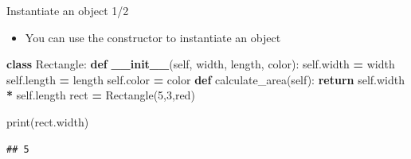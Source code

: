 \documentclass[
  8pt,
  ignorenonframetext,
]{beamer}
\newenvironment{Shaded}{\begin{snugshade}}{\end{snugshade}}
\newcommand{\BuiltInTok}[1]{#1}
\newcommand{\ControlFlowTok}[1]{\textcolor[rgb]{0.13,0.29,0.53}{\textbf{#1}}}
\newcommand{\DecValTok}[1]{\textcolor[rgb]{0.00,0.00,0.81}{#1}}
\newcommand{\FunctionTok}[1]{\textcolor[rgb]{0.13,0.29,0.53}{\textbf{#1}}}
\newcommand{\KeywordTok}[1]{\textcolor[rgb]{0.13,0.29,0.53}{\textbf{#1}}}
\newcommand{\NormalTok}[1]{#1}
\newcommand{\OperatorTok}[1]{\textcolor[rgb]{0.81,0.36,0.00}{\textbf{#1}}}
\newcommand{\StringTok}[1]{\textcolor[rgb]{0.31,0.60,0.02}{#1}}
\newcommand{\VariableTok}[1]{\textcolor[rgb]{0.00,0.00,0.00}{#1}}
\providecommand{\tightlist}{%
  \setlength{\itemsep}{0pt}\setlength{\parskip}{0pt}}
\begin{document}
\begin{frame}[fragile]{Instantiate an object 1/2}
\protect\hypertarget{instantiate-an-object-12}{}
\begin{itemize}
\tightlist
\item
  You can use the constructor to instantiate an object
\end{itemize}

\begin{Shaded}
\begin{Highlighting}[]
\KeywordTok{class}\NormalTok{ Rectangle:}
    \KeywordTok{def} \FunctionTok{\_\_init\_\_}\NormalTok{(}\VariableTok{self}\NormalTok{, width, length, color):}
        \VariableTok{self}\NormalTok{.width }\OperatorTok{=}\NormalTok{ width}
        \VariableTok{self}\NormalTok{.length }\OperatorTok{=}\NormalTok{ length}
        \VariableTok{self}\NormalTok{.color }\OperatorTok{=}\NormalTok{ color}
    \KeywordTok{def}\NormalTok{ calculate\_area(}\VariableTok{self}\NormalTok{):}
      \ControlFlowTok{return} \VariableTok{self}\NormalTok{.width }\OperatorTok{*} \VariableTok{self}\NormalTok{.length}
\NormalTok{rect }\OperatorTok{=}\NormalTok{ Rectangle(}\DecValTok{5}\NormalTok{,}\DecValTok{3}\NormalTok{,}\StringTok{\textquotesingle{}red\textquotesingle{}}\NormalTok{)}

\BuiltInTok{print}\NormalTok{(rect.width)}
\end{Highlighting}
\end{Shaded}

\begin{verbatim}
## 5
\end{verbatim}
\end{frame}
\end{document}
